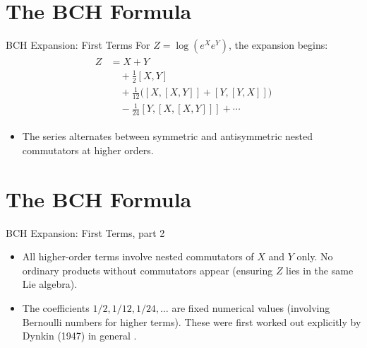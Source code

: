 \documentclass{beamer}
\begin{document}
\section{The BCH Formula}
\begin{frame}{BCH Expansion: First Terms}
For $Z = \log(e^X e^Y)$, the expansion begins:
\begin{align*}
\begin{split} Z &= X + Y \\ &\quad+ \frac{1}{2}[X, Y] \\ &\quad+ \frac{1}{12}\big([X,[X,Y]] + [Y,[Y,X]]\big) \\ &\quad- \frac{1}{24}[Y,[X,[X,Y]]] + \cdots \end{split}
\end{align*}
\begin{itemize}
\item The series alternates between symmetric and antisymmetric nested commutators at higher orders.
\end{itemize}
\end{frame}


\section{The BCH Formula}
\begin{frame}{BCH Expansion: First Terms, part 2}
\begin{itemize}
\item All higher-order terms involve nested commutators of $X$ and $Y$ only. No ordinary products without commutators appear (ensuring $Z$ lies in the same Lie algebra).
\item The coefficients $1/2, 1/12, 1/24, \ldots$ are fixed numerical values (involving Bernoulli numbers for higher terms). These were first worked out explicitly by Dynkin (1947) in general .
\end{itemize}
\end{frame}
\end{document}
